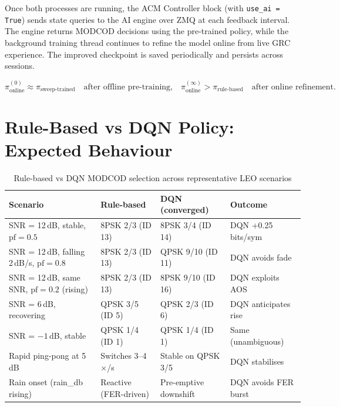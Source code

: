 \documentclass[12pt,a4paper]{report}
\begin{document}
Once both processes are running, the ACM Controller block (with
\texttt{use\_ai = True}) sends state queries to the AI engine over ZMQ at
each feedback interval. The engine returns MODCOD decisions using the
pre-trained policy, while the background training thread continues to
refine the model online from live GRC experience. The improved checkpoint
is saved periodically and persists across sessions.

\begin{equation}
    \pi_\text{online}^{(0)} \approx \pi_\text{sweep-trained}
    \quad \text{after offline pre-training,}
    \quad
    \pi_\text{online}^{(\infty)} > \pi_\text{rule-based}
    \quad \text{after online refinement.}
\end{equation}

\section{Rule-Based vs DQN Policy: Expected Behaviour}

\begin{table}[H]
\centering
\caption{Rule-based vs DQN MODCOD selection across representative LEO scenarios}
\label{tab:policy_compare}
\begin{tabular}{p{4.2cm}p{3.2cm}p{3.2cm}p{2cm}}
\toprule
\textbf{Scenario} & \textbf{Rule-based} & \textbf{DQN (converged)} & \textbf{Outcome} \\
\midrule
SNR = 12\,dB, stable, $\text{pf}=0.5$
  & 8PSK 2/3 (ID 13)  & 8PSK 3/4 (ID 14) & DQN +0.25\,bits/sym \\
SNR = 12\,dB, falling 2\,dB/s, $\text{pf}=0.8$
  & 8PSK 2/3 (ID 13)  & QPSK 9/10 (ID 11) & DQN avoids fade \\
SNR = 12\,dB, same SNR, $\text{pf}=0.2$ (rising)
  & 8PSK 2/3 (ID 13)  & 8PSK 9/10 (ID 16) & DQN exploits AOS \\
SNR = 6\,dB, recovering
  & QPSK 3/5 (ID 5)   & QPSK 2/3 (ID 6)  & DQN anticipates rise \\
SNR = $-1$\,dB, stable
  & QPSK 1/4 (ID 1)   & QPSK 1/4 (ID 1)  & Same (unambiguous) \\
Rapid ping-pong at 5\,dB
  & Switches 3--4$\times$/s & Stable on QPSK 3/5 & DQN stabilises \\
Rain onset (rain\_db rising)
  & Reactive (FER-driven) & Pre-emptive downshift & DQN avoids FER burst \\
\bottomrule
\end{tabular}
\end{table}
\end{document}
